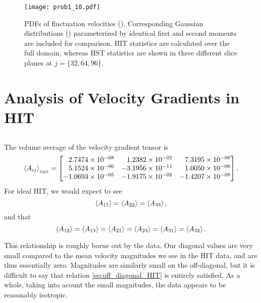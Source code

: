 \documentclass[11pt]{article}
\begin{document}
\begin{figure}[t]
\centering
\texttt{[image: prob1\_10.pdf]}
\\[6pt]
\caption{PDFs of fluctuation velocities (). Corresponding Gaussian distributions () parameterized by identical first and second moments are included for comparison. HIT statistics are calculated over the full domain, whereas HST statistics are shown in three different slice planes at $j = \{32,64,96\}$.}
\label{fig:prob_1_10_fluctuation_pdfs}
\end{figure}

\section{Analysis of Velocity Gradients in HIT}

\subsection{}

The volume average of the velocity gradient tensor is
\[
\expectation{A_{ij}}_{xyz} =
\begin{bmatrix*}[r]
 2.7474\e{-08} &  1.2382\e{-02} &  7.3195\e{-06} \\
 5.1524\e{-06} & -3.1956\e{-11} &  1.0050\e{-06} \\
-1.0693\e{-05} & -1.9175\e{-02} & -1.4207\e{-08}
\end{bmatrix*}
.
\]
For ideal HIT, we would expect to see
\begin{equation}
\left< A_{11} \right> = \left< A_{22} \right> = \left< A_{33} \right>
,
\label{eq:on_diagonal_HIT}
\end{equation}
and that
\begin{equation}
\left< A_{12} \right> = \left< A_{13} \right> = \left< A_{21} \right> = \left< A_{23} \right> = \left< A_{31} \right> = \left< A_{32} \right>
.
\label{eq:off_diagonal_HIT}
\end{equation}

This relationship is roughly borne out by the data. Our diagonal values are very small compared to the mean velocity magnitudes we see in the HIT data, and are thus essentially zero. Magnitudes are similarly small on the off-diagonal, but it is difficult to say that relation \eqref{eq:off_diagonal_HIT} is entirely satisfied. As a whole, taking into acount the small magnitudes, the data appears to be reasonably isotropic.

\subsection{}
\end{document}

